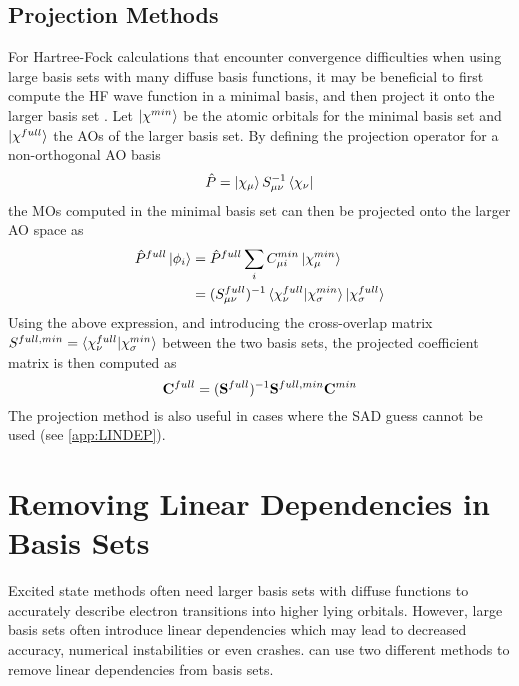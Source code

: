 \section{Projection Methods}

For Hartree-Fock calculations that encounter convergence difficulties when using large basis sets with many diffuse basis functions, it may be beneficial to first compute the HF wave function in a minimal basis, and then project it onto the larger basis set \cite{Leh2019}. Let $\ket{\smash{\chi^{min}}}$ be the atomic orbitals for the minimal basis set and $\ket{\smash{\chi^{full}}}$ the AOs of the larger basis set. By defining the projection operator for a non-orthogonal AO basis
\begin{equation}
\hat{P} = \ket{\smash{\chi_{\mu}}} S_{\mu\nu}^{-1} \bra{\smash{\chi_{\nu}}}
\end{equation}
\noindent the MOs computed in the minimal basis set can then be projected onto the larger AO space as
\begin{equation}
\begin{split}
\hat{P}^{full}\ket{\smash{\phi_i}} &= \hat{P}^{full}\sum_i C^{min}_{\mu i} \ket{\smash{\chi^{min}_\mu}} \\
	&= (S^{full}_{\mu\nu})^{-1} \bra{\smash{\chi^{full}_{\nu}}}\ket{\smash{\chi^{min}_{\sigma}}} \ket{\smash{\chi^{full}_{\sigma}}}
\end{split} 
\end{equation}
\noindent Using the above expression, and introducing the cross-overlap matrix $S^{full,min} = \bra{\smash{\chi^{full}_{\nu}}}\ket{\smash{\chi^{min}_{\sigma}}}$ between the two basis sets, the projected coefficient matrix is then computed as
\begin{equation}
\mathbf{C}^{full} = (\mathbf{S}^{full})^{-1} \mathbf{S}^{full,min} \mathbf{C}^{min} 
\end{equation}
\noindent The projection method is also useful in cases where the SAD guess cannot be used (see \ref{app:LINDEP}). 

\chapter{Removing Linear Dependencies in Basis Sets \label{app:LINDEP}}

Excited state methods often need larger basis sets with diffuse functions to accurately describe electron transitions into higher lying orbitals. However, large basis sets often introduce linear dependencies which may lead to decreased accuracy, numerical instabilities or even crashes. \mchem{} can use two different methods to remove linear dependencies from basis sets.

